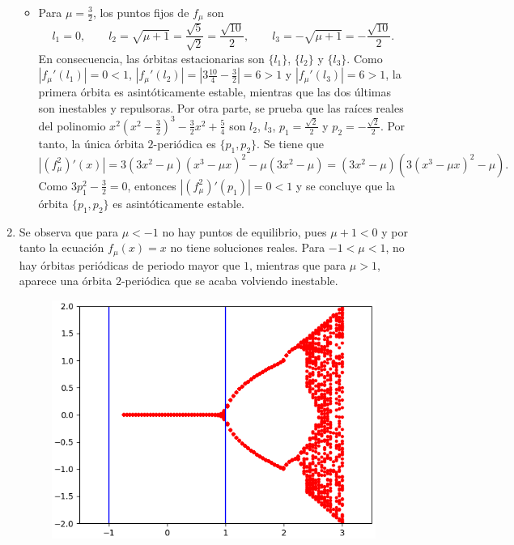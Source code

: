 \documentclass[11pt]{report}
\begin{document}
\begin{solution}
\begin{enumerate}
\begin{itemize}
            \item Para $\mu = \frac{3}{2}$, los puntos fijos de $f_\mu$ son
            \[l_1 = 0, \qquad l_2 = \sqrt{\mu+1} = \frac{\sqrt{5}}{\sqrt{2}} = \frac{\sqrt{10}}{2}, \qquad l_3 = -\sqrt{\mu+1} = -\frac{\sqrt{10}}{2}.\]
            En consecuencia, las órbitas estacionarias son $\{l_1\}$, $\{l_2\}$ y $\{l_3\}$. Como $|f_\mu'(l_1)| = 0 < 1$, $|f_\mu'(l_2)| = |3\frac{10}{4}-\frac{3}{2}| = 6 > 1$ y $|f_\mu'(l_3)| = 6 > 1$, la primera órbita es asintóticamente estable, mientras que las dos últimas son inestables y repulsoras. Por otra parte, se prueba que las raíces reales del polinomio $x^2(x^2-\frac{3}{2})^3-\frac{3}{2}x^2+\frac{5}{4}$ son $l_2$, $l_3$, $p_1 = \frac{\sqrt{2}}{2}$ y $p_2 = -\frac{\sqrt{2}}{2}$. Por tanto, la única órbita $2$-periódica es $\{p_1,p_2\}$. Se tiene que
            \[|(f_\mu^2)'(x)| = 3(3x^2-\mu)(x^3-\mu x)^2-\mu(3x^2-\mu) = (3x^2-\mu)(3(x^3-\mu x)^2 - \mu).\]
            Como $3p_1^2-\frac{3}{2} = 0$, entonces $|(f_\mu^2)'(p_1)| = 0 < 1$ y se concluye que la órbita $\{p_1,p_2\}$ es asintóticamente estable.
        \end{itemize}
        \item Se observa que para $\mu < -1$ no hay puntos de equilibrio, pues $\mu+1 < 0$ y por tanto la ecuación $f_\mu(x) = x$ no tiene soluciones reales. Para $-1 < \mu < 1$, no hay órbitas periódicas de periodo mayor que $1$, mientras que para $\mu > 1$, aparece una órbita $2$-periódica que se acaba volviendo inestable.
        \begin{figure}[H]
        \centering
        \includegraphics[scale = 0.8]{./img/Figure_3.png}
        \end{figure}

\end{enumerate}
\end{solution}
\end{document}
